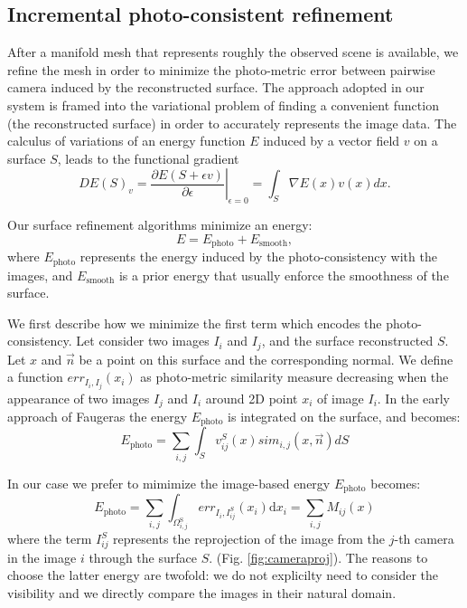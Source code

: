 \subsection{Incremental photo-consistent refinement}
\label{sec:Incremental_photoconsistent}
After a manifold mesh that represents roughly the observed scene is available, we refine the mesh in order to minimize the photo-metric error between pairwise camera induced by the reconstructed surface. 
The approach adopted in our system is framed into the variational problem of finding a convenient function (the reconstructed surface) in order to  accurately represents the image data.
The calculus of variations of an energy function $E$ induced by a vector field $v$ on a surface $\mathit{S}$, leads to the functional gradient
\begin{equation}
\label{eq::calculus}
 DE(\mathit{S})_v = \left.\frac{\partial E(\mathit{S} + \epsilon v)}{\partial \epsilon} \right|_{\epsilon=0} = \int_{\mathit{S}} \nabla E(x)v(x) dx.
\end{equation}

Our surface refinement algorithms minimize an energy:
\begin{equation}
E = E_{\textrm{photo}} + E_{\textrm{smooth}} ,
\end{equation}
where  $E_{\textrm{photo}}$ represents the energy induced by  the photo-consistency with the images, and $E_{\textrm{smooth}}$ is a prior energy that usually enforce the smoothness of the surface.  


We first describe how we minimize the first term which encodes the photo-consistency.
Let consider two images $I_i$ and $I_j$, and the surface reconstructed $\mathit{S}$. Let $x$ and $\overrightarrow{n}$ be a point on this surface and the corresponding normal. We define a function $err_{I_i, I_j}(x_i)$ as photo-metric similarity measure decreasing when the appearance of two images $I_j$ and $I_i$ around 2D point $x_i$ of image $I_i$.
In the early approach of Faugeras \etal \cite{faugeras2002variational} the energy $E_{\textrm{photo}}$ is integrated on the surface, and becomes:
\begin{equation}
 E_{\textrm{photo}} = \sum_{i,j}\int_{\mathit{S}} v^{\mathit{S}}_{ij}(x) sim_{i,j}(x, \overrightarrow{n}) d\mathit{S}
\end{equation}


In our case we prefer to mimimize  \cite{pons2007multi} the image-based  energy $E_{\textrm{photo}}$ becomes:
\begin{equation}
\label{eq:energy_photo}
  E_{\textrm{photo}} = \sum_{i,j}\int_{\Omega^{\textrm{S}}_{i,j}} err_{I_i, I_{ij}^{\mathit{S}}}(x_i)\textrm{d}x_i = \sum_{i,j} \mathit{M}_{ij}(x)
\end{equation}
where the term $I_{ij}^{\mathit{S}}$ represents the reprojection of the image from the $j$-th camera in the image $i$ through the surface $\mathit{S}$.
(Fig. \ref{fig:cameraproj}).
The reasons to choose the latter energy are twofold: we do not explicilty need to consider the visibility and we directly compare the images in their natural domain.

